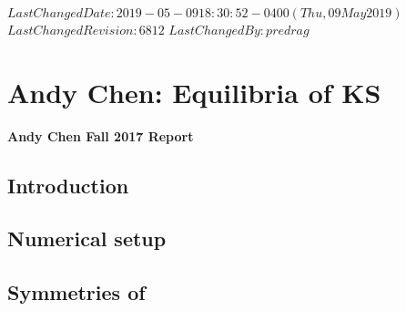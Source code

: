 {$LastChangedDate: 2019-05-09 18:30:52 -0400 (Thu, 09 May 2019) $}
{$LastChangedRevision: 6812 $} {$LastChangedBy: predrag $}

\chapter{Andy Chen: Equilibria of KS}
\label{chap:reportAC}

\noindent
{\Large{\textbf{Andy Chen Fall 2017 Report}}}

\section{Introduction}
\label{sect:Repintro}
	

    
%
%
%
%
%
%

\section{\KSe}
\label{chap:KS}
    

\section{Numerical setup}
\label{sect:KSnumer}
	

\section{Symmetries of \KSe}
\label{sect:KSsym}
    

